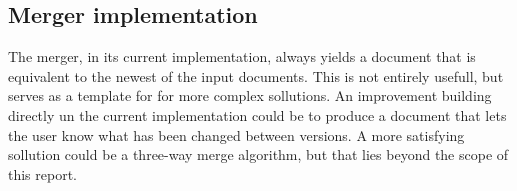 \subsection{Merger implementation}
The merger, in its current implementation, always yields a document that is equivalent to the newest of the input documents.
This is not entirely usefull, but serves as a template for for more complex sollutions. An improvement building directly un the current implementation could be to produce a document that lets the user know what has been changed between 
versions. A more satisfying sollution could be a three-way merge algorithm, but that lies beyond  the scope of this report.
